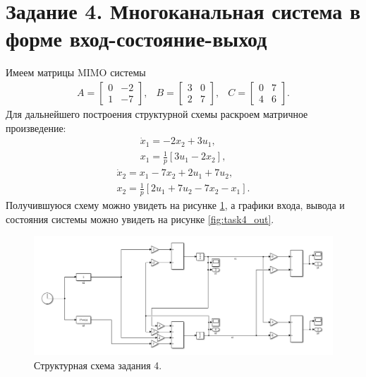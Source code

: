 \section*{Задание 4. Многоканальная система в форме вход-состояние-выход}

Имеем матрицы MIMO системы
\begin{equation*}
    \begin{array}{ccc}
        A=\begin{bmatrix}
            0&-2\\1&-7
        \end{bmatrix},&
        B=\begin{bmatrix}
            3&0\\2&7
        \end{bmatrix},&
        C=\begin{bmatrix}
            0&7\\4&6
        \end{bmatrix}.
    \end{array}
\end{equation*}
Для дальнейшего построения структурной схемы раскроем матричное произведение:
\begin{equation*}
    \begin{array}{c}
        \dot x_1=-2x_2+3u_1,\\[2mm]
        x_1=\frac{1}{p}[3u_1-2x_2],
    \end{array}
\end{equation*}
\begin{equation*}
    \begin{array}{c}
        \dot x_2=x_1-7x_2+2u_1+7u_2,\\[2mm]
        x_2=\frac{1}{p}[2u_1+7u_2-7x_2-x_1].
    \end{array}
\end{equation*}
Получившуюся схему можно увидеть на рисунке \ref{fig:task4_slx}, а графики входа,
вывода и состояния системы можно увидеть на рисунке \ref{fig:task4_out}.
\begin{figure}[htbp]
    \centering
    \includegraphics[width=1\linewidth]{figs/task_4_slx.png}
    \caption{Структурная схема задания 4.}
    \label{fig:task4_slx}
\end{figure}

